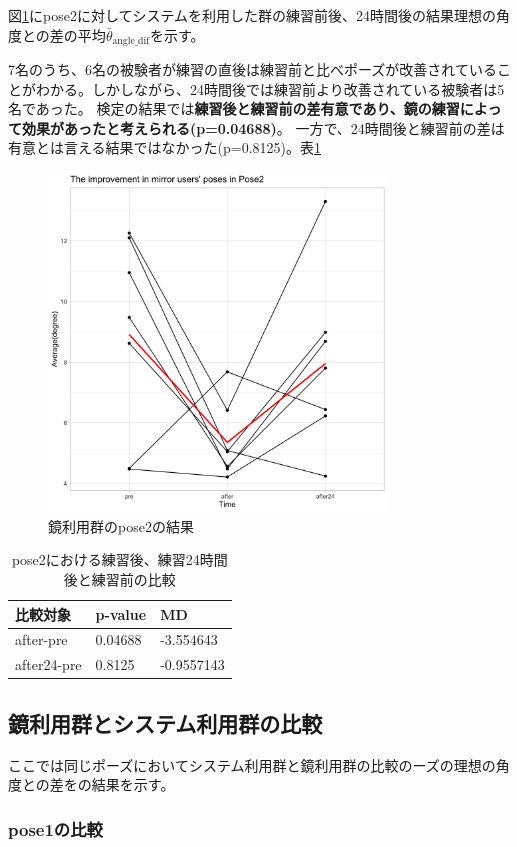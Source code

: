   図\ref{fig:pose2_mirror}にpose2に対してシステムを利用した群の練習前後、24時間後の結果理想の角度との差の平均\(\bar{\theta}_{\text{angle\_dif}}\)を示す。


7名のうち、6名の被験者が練習の直後は練習前と比べポーズが改善されていることがわかる。しかしながら、24時間後では練習前より改善されている被験者は5名であった。
検定の結果では{\bf 練習後と練習前の差有意であり、鏡の練習によって効果があったと考えられる(p=0.04688)}。 一方で、24時間後と練習前の差は有意とは言える結果ではなかった(p=0.8125)。表\ref{table:pose2_mirror_p_value}
\begin{figure}[H]
  \begin{center}
  \includegraphics[width=9cm]{figures/pose2_system_false_graph.png}
  \caption{鏡利用群のpose2の結果}
  \label{fig:pose2_mirror}
  \end{center}
\end{figure}

\begin{table}[h]
  \centering
  \caption{pose2における練習後、練習24時間後と練習前の比較}
  \begin{tabular}{|l|l|l|}
  \hline
  \textbf{比較対象} & \textbf{p-value} & \textbf{MD} \\ \hline
  after-pre & 0.04688 & -3.554643 \\ \hline
  after24-pre & 0.8125 & -0.9557143 \\ \hline
  \end{tabular}
  \label{table:pose2_mirror_p_value}
  \end{table}

\subsection{鏡利用群とシステム利用群の比較}
ここでは同じポーズにおいてシステム利用群と鏡利用群の比較のーズの理想の角度との差をの結果を示す。

\subsubsection{pose1の比較}


